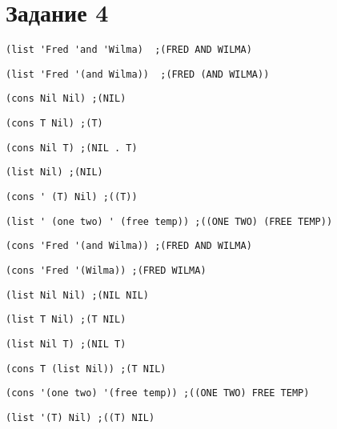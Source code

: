 \section{Задание 4}
\begin{center}
	\begin{lstlisting}[label=b4, caption={Выражение 1}]
(list 'Fred 'and 'Wilma)  ;(FRED AND WILMA)
	\end{lstlisting}
	\begin{lstlisting}[label=a4, caption={Выражение 2}]
(list 'Fred '(and Wilma))  ;(FRED (AND WILMA))
	\end{lstlisting}
	\begin{lstlisting}[label=c4, caption={Выражение 3}]
(cons Nil Nil) ;(NIL)
	\end{lstlisting}
	\begin{lstlisting}[label=d4, caption={Выражение 4}]
(cons T Nil) ;(T)
	\end{lstlisting}

	\begin{lstlisting}[label=b42, caption={Выражение 5}]
(cons Nil T) ;(NIL . T)
	\end{lstlisting}
	\begin{lstlisting}[label=a42, caption={Выражение 6}]
(list Nil) ;(NIL)
	\end{lstlisting}
	\begin{lstlisting}[label=c42, caption={Выражение 7}]
(cons ' (T) Nil) ;((T))
	\end{lstlisting}
	\begin{lstlisting}[label=d42, caption={Выражение 8}]
(list ' (one two) ' (free temp)) ;((ONE TWO) (FREE TEMP))
	\end{lstlisting}

	\begin{lstlisting}[label=b43, caption={Выражение 9}]
(cons 'Fred '(and Wilma)) ;(FRED AND WILMA)
	\end{lstlisting}
	\begin{lstlisting}[label=a43, caption={Выражение 10}]
(cons 'Fred '(Wilma)) ;(FRED WILMA)
	\end{lstlisting}
	\begin{lstlisting}[label=c43, caption={Выражение 11}]
(list Nil Nil) ;(NIL NIL)
	\end{lstlisting}
	\begin{lstlisting}[label=d43, caption={Выражение 12}]
(list T Nil) ;(T NIL)
	\end{lstlisting}

	\begin{lstlisting}[label=b44, caption={Выражение 13}]
(list Nil T) ;(NIL T)
	\end{lstlisting}
	\begin{lstlisting}[label=a44, caption={Выражение 14}]
(cons T (list Nil)) ;(T NIL)
	\end{lstlisting}
	\begin{lstlisting}[label=c44, caption={Выражение 15}]
(cons '(one two) '(free temp)) ;((ONE TWO) FREE TEMP)
	\end{lstlisting}
	\begin{lstlisting}[label=d44, caption={Выражение 16}]
(list '(T) Nil) ;((T) NIL)
	\end{lstlisting}
\end{center}
